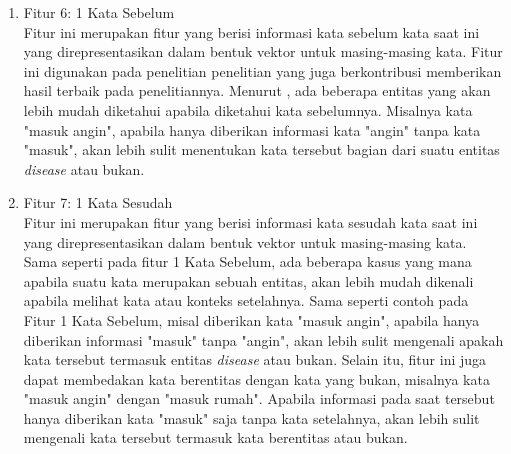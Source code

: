 \begin{enumerate}
 \item Fitur 6: 1 Kata Sebelum\\
 Fitur ini merupakan fitur yang berisi informasi kata sebelum kata saat ini yang direpresentasikan dalam bentuk vektor untuk masing-masing kata. Fitur ini digunakan pada penelitian penelitian \cite{skripsiKakRadit} yang juga berkontribusi memberikan hasil terbaik pada penelitiannya. Menurut \saya, ada beberapa entitas yang akan lebih mudah diketahui apabila diketahui kata sebelumnya. Misalnya kata "masuk angin", apabila hanya diberikan informasi kata "angin" tanpa kata "masuk", akan lebih sulit menentukan kata tersebut bagian dari suatu entitas \textit{disease} atau bukan.
  
 \item Fitur 7: 1 Kata Sesudah\\
 Fitur ini merupakan fitur yang berisi informasi kata sesudah kata saat ini yang direpresentasikan dalam bentuk vektor untuk masing-masing kata. Sama seperti pada fitur 1 Kata Sebelum, ada beberapa kasus yang mana apabila suatu kata merupakan sebuah entitas, akan lebih mudah dikenali apabila melihat kata atau konteks setelahnya. Sama seperti contoh pada Fitur 1 Kata Sebelum, misal diberikan kata "masuk angin", apabila hanya diberikan informasi "masuk" tanpa "angin", akan lebih sulit mengenali apakah kata tersebut termasuk entitas \textit{disease} atau bukan. Selain itu, fitur ini juga dapat membedakan kata berentitas dengan kata yang bukan, misalnya kata "masuk angin" dengan "masuk rumah". Apabila informasi pada saat tersebut hanya diberikan kata "masuk" saja tanpa kata setelahnya, akan lebih sulit mengenali kata tersebut termasuk kata berentitas atau bukan.
  
\end{enumerate}

